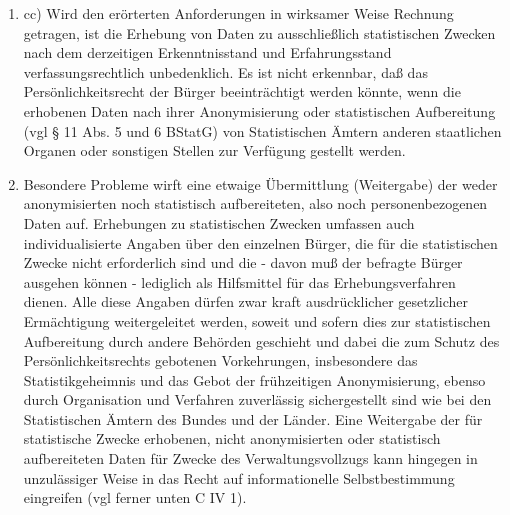 \begin{enumerate}[label=\arabic*,start=104]
            \item cc) Wird den erörterten Anforderungen in wirksamer Weise Rechnung getragen, ist die Erhebung von Daten zu ausschließlich statistischen Zwecken nach dem derzeitigen Erkenntnisstand und Erfahrungsstand verfassungsrechtlich unbedenklich. Es ist nicht erkennbar, daß das Persönlichkeitsrecht der Bürger beeinträchtigt werden könnte, wenn die erhobenen Daten nach ihrer Anonymisierung oder statistischen Aufbereitung (vgl § 11 Abs. 5 und 6 BStatG) von Statistischen Ämtern anderen staatlichen Organen oder sonstigen Stellen zur Verfügung gestellt werden.
            \item Besondere Probleme wirft eine etwaige Übermittlung (Weitergabe) der weder anonymisierten noch statistisch aufbereiteten, also noch personenbezogenen Daten auf. Erhebungen zu statistischen Zwecken umfassen auch individualisierte Angaben über den einzelnen Bürger, die für die statistischen Zwecke nicht erforderlich sind und die - davon muß der befragte Bürger ausgehen können - lediglich als Hilfsmittel für das Erhebungsverfahren dienen. Alle diese Angaben dürfen zwar kraft ausdrücklicher gesetzlicher Ermächtigung weitergeleitet werden, soweit und sofern dies zur statistischen Aufbereitung durch andere Behörden geschieht und dabei die zum Schutz des Persönlichkeitsrechts gebotenen Vorkehrungen, insbesondere das Statistikgeheimnis und das Gebot der frühzeitigen Anonymisierung, ebenso durch Organisation und Verfahren zuverlässig sichergestellt sind wie bei den Statistischen Ämtern des Bundes und der Länder. Eine Weitergabe der für statistische Zwecke erhobenen, nicht anonymisierten oder statistisch aufbereiteten Daten für Zwecke des Verwaltungsvollzugs kann hingegen in unzulässiger Weise in das Recht auf informationelle Selbstbestimmung eingreifen (vgl ferner unten C IV 1).
        \end{enumerate}
